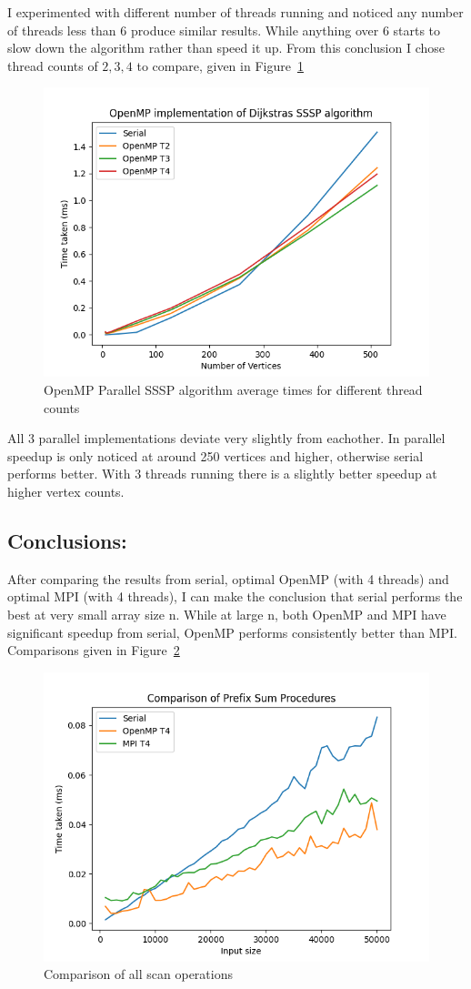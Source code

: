 	I experimented with different number of threads running and noticed any number of threads less than 6 produce similar results. While anything over 6 starts to slow down the algorithm rather than speed it up. From this conclusion I chose thread counts of $2,3,4$ to compare, given in Figure~\ref{fig:fig_sssp_omp}
	\begin{figure}[!htb]
		\centering
		\includegraphics[width=0.6\linewidth]{sssp_omp.png}
		\caption{OpenMP Parallel SSSP algorithm average times for different thread counts}
		\label{fig:fig_sssp_omp}
	\end{figure}

	All 3 parallel implementations deviate very slightly from eachother. In parallel speedup is only noticed at around 250 vertices and higher, otherwise serial performs better. With 3 threads running there is a slightly better speedup at higher vertex counts.
	
	\newpage
	\subsection{Conclusions:}
	After comparing the results from serial, optimal OpenMP (with 4 threads) and optimal MPI (with 4 threads), I can make the conclusion that serial performs the best at very small array size n. While at large n, both OpenMP and MPI have significant speedup from serial, OpenMP performs consistently better than MPI.
	Comparisons given in Figure~\ref{fig:fig_scan_comparison}
	\begin{figure}[!htb]
		\centering
		\includegraphics[width=0.6\linewidth]{scan_comparison.png}
		\caption{Comparison of all scan operations}
		\label{fig:fig_scan_comparison}
	\end{figure}

